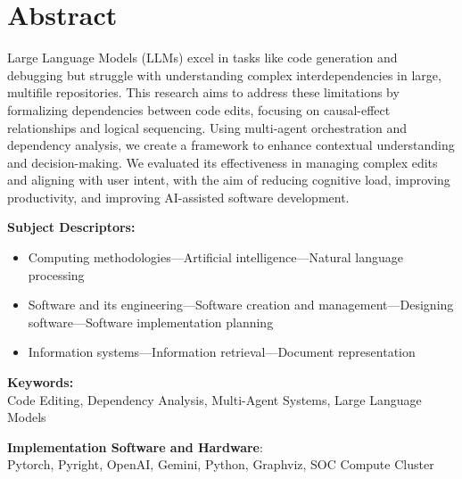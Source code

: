 \chapter*{Abstract}

Large Language Models (LLMs) excel in tasks like code generation and debugging but struggle with understanding complex interdependencies in large, multifile repositories. This research aims to address these limitations by formalizing dependencies between code edits, focusing on causal-effect relationships and logical sequencing. Using multi-agent orchestration and dependency analysis, we create a framework to enhance contextual understanding and decision-making. We evaluated its effectiveness in managing complex edits and aligning with user intent, with the aim of reducing cognitive load, improving productivity, and improving AI-assisted software development.


\noindent\textbf{Subject Descriptors:}
\begin{itemize}
    \item Computing methodologies---Artificial intelligence---Natural language processing
    \item Software and its engineering---Software creation and management---Designing software---Software implementation planning
    \item Information systems---Information retrieval---Document representation
\end{itemize}

\noindent\textbf{Keywords:}\\
\hspace*{.5cm} Code Editing, Dependency Analysis, Multi-Agent Systems, Large Language Models

\noindent\textbf{Implementation Software and Hardware}:\\
\hspace*{.5cm} Pytorch, Pyright, OpenAI, Gemini, Python, Graphviz, SOC Compute Cluster
